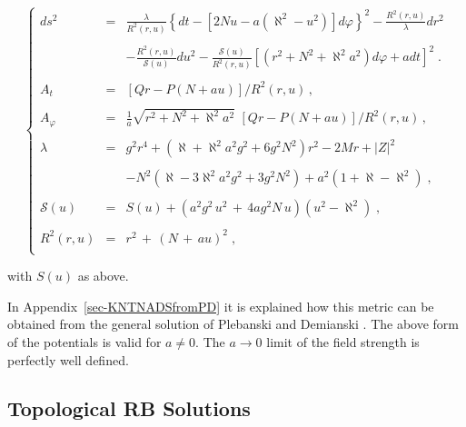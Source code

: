 \documentclass[12pt,a4paper]{article}
\begin{document}
\begin{equation}
\label{eq:KNTNaDS}
\left\{
\begin{array}{rcl}
ds^{2} & = & 
{\displaystyle\frac{\lambda}{R^{2}(r,u)}
\left\{dt-\left[2Nu
-a\left(\aleph^{2}-u^{2}\right)\right]d\varphi\right\}^{2}}
-{\displaystyle\frac{R^{2}(r,u)}{\lambda}} dr^{2} \\
& & \\
& &   
-{\displaystyle\frac{R^{2}(r,u)}{\mathcal{S}(u)}}du^{2}
-{\displaystyle\frac{\mathcal{S}(u)}{R^{2}(r,u)}
\left[\left(r^{2}+N^{2}+\aleph^{2}a^{2}\right)d\varphi 
                +adt \right]^{2}} \; . \\
& & \\
A_{t} & = & {\displaystyle\left[Qr-P(N+au)\right]}/R^{2}(r,u)\, ,\\
& & \\
A_{\varphi} & = & {\displaystyle\frac{1}{a}}
\sqrt{r^{2}+N^{2}+\aleph^{2}a^{2}}\,\,
{\displaystyle\left[Qr-P(N+au)\right]}/R^{2}(r,u)\, ,\\
& & \\
\lambda & = &  g^{2}r^{4} 
+\left(\aleph +\aleph^{2}a^{2}g^{2} +6g^{2}N^{2}\right) r^{2}
-2Mr +|Z|^{2} \\
& & \\
& &  
-N^{2}\left(\aleph -3\aleph^{2}a^{2}g^{2} +3g^{2}N^{2}\right)
+a^{2}\left(1+\aleph -\aleph^{2}\right)\; ,\\
& & \\
\mathcal{S}(u) & = & S(u)
+\left(a^{2}g^{2}\, u^{2}\,+\, 4ag^{2}N\, u\right)
\left( u^{2}-\aleph^{2} \right)\; , \\
& & \\
R^{2}(r,u) & = & r^{2}\,+\, \left(N\,+\, au\right)^{2}\; ,\\
\end{array}
\right.
\end{equation}

\noindent with $S(u)$ as above.

In Appendix~\ref{sec-KNTNADSfromPD} it is explained how this metric
can be obtained from the general solution of Plebanski and Demianski
\cite{art:PD}. The above form of the potentials is valid for $a\neq
0$. The $a\rightarrow 0$ limit of the field strength is perfectly well
defined.


\subsection{Topological RB Solutions}
\end{document}
